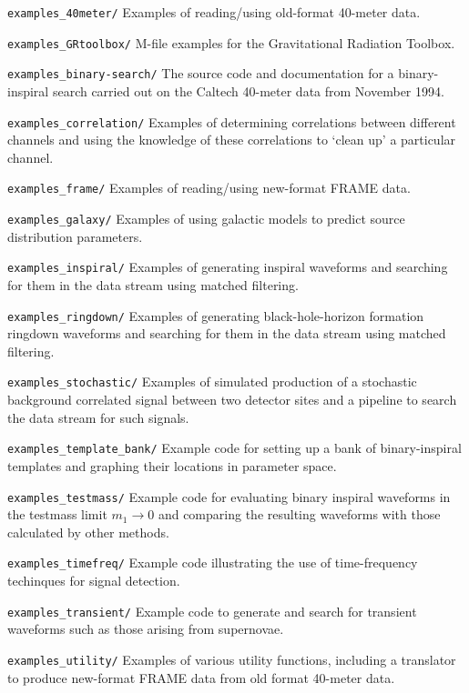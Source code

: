 \begin{description}
\begin{description}
\begin{description}
\item{\tt examples\_40meter/} Examples of reading/using old-format
40-meter data.
\item{\tt examples\_GRtoolbox/} M-file examples for the Gravitational 
Radiation Toolbox.
\item{\tt examples\_binary-search/} The source code and documentation for a
binary-inspiral search carried out on the Caltech 40-meter data from
November 1994.
\item{\tt examples\_correlation/} Examples of determining correlations
between different channels and using the knowledge of these
correlations to `clean up' a particular channel.
\item{\tt examples\_frame/} Examples of reading/using new-format FRAME
data.
\item{\tt examples\_galaxy/} Examples of using galactic models to
predict source distribution parameters.
\item{\tt examples\_inspiral/} Examples of generating inspiral
waveforms and searching for them in the data stream using matched filtering.
\item{\tt examples\_ringdown/} Examples of generating
black-hole-horizon formation ringdown waveforms and searching for them
in the data stream using matched filtering.
\item{\tt examples\_stochastic/} Examples of simulated production of a
stochastic background correlated signal between two detector sites and
a pipeline to search the data stream for such signals.
\item{\tt examples\_template\_bank/} Example code for setting up a
bank of binary-inspiral templates and graphing their locations in
parameter space.
\item{\tt examples\_testmass/} Example code for evaluating binary inspiral
waveforms in the testmass limit $m_1 \to 0$ and comparing the resulting
waveforms with those calculated by other methods.
\item{\tt examples\_timefreq/} Example code illustrating the use of time-frequency techinques
for signal detection.
\item{\tt examples\_transient/} Example code to generate and search
for transient waveforms such as those arising from supernovae.
\item{\tt examples\_utility/} Examples of various utility functions,
including a translator to produce new-format FRAME data from old
format 40-meter data.
\end{description}

\end{description}
\end{description}
